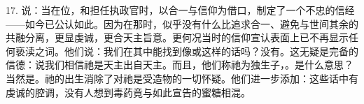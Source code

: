 17. 说：当在位，和担任执政官时，以合一与信仰为借口，制定了一个不忠的信经——如今已公认如此。因为在那时，似乎没有什么比追求合一、避免与世间其余的共融分离，更显虔诚，更合天主旨意。更何况当时的信仰宣认表面上已不再显示任何亵渎之词。他们说：我们在其中能找到像或这样的话吗？没有。这无疑是完备的信德：说我们相信祂是天主出自天主。而且，他们称祂为独生子，。是什么意思？当然是。祂的出生消除了对祂是受造物的一切怀疑。他们进一步添加：这些话中有虔诚的腔调，没有人想到毒药竟与如此宣告的蜜糖相混。\par


